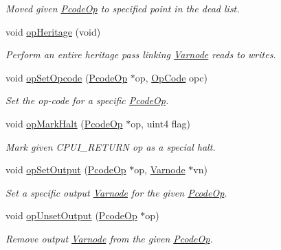 \begin{DoxyCompactItemize}
\begin{DoxyCompactList}\small\item\em Moved given \mbox{\hyperlink{class_pcode_op}{Pcode\+Op}} to specified point in the {\itshape dead} list. \end{DoxyCompactList}\item 
void \mbox{\hyperlink{class_funcdata_a99d243f1e771d6e220330feb534a3fee}{op\+Heritage}} (void)
\begin{DoxyCompactList}\small\item\em Perform an entire heritage pass linking \mbox{\hyperlink{class_varnode}{Varnode}} reads to writes. \end{DoxyCompactList}\item 
void \mbox{\hyperlink{class_funcdata_ad9dbf52668db4a1923537e2128719181}{op\+Set\+Opcode}} (\mbox{\hyperlink{class_pcode_op}{Pcode\+Op}} $\ast$op, \mbox{\hyperlink{opcodes_8hh_abeb7dfb0e9e2b3114e240a405d046ea7}{Op\+Code}} opc)
\begin{DoxyCompactList}\small\item\em Set the op-\/code for a specific \mbox{\hyperlink{class_pcode_op}{Pcode\+Op}}. \end{DoxyCompactList}\item 
void \mbox{\hyperlink{class_funcdata_acdbfab2362e4d4945c3feb7d3f2c42f2}{op\+Mark\+Halt}} (\mbox{\hyperlink{class_pcode_op}{Pcode\+Op}} $\ast$op, uint4 flag)
\begin{DoxyCompactList}\small\item\em Mark given C\+P\+U\+I\+\_\+\+R\+E\+T\+U\+RN op as a {\itshape special} halt. \end{DoxyCompactList}\item 
void \mbox{\hyperlink{class_funcdata_ab2bd3523c574c5b303728ef4d880ec3a}{op\+Set\+Output}} (\mbox{\hyperlink{class_pcode_op}{Pcode\+Op}} $\ast$op, \mbox{\hyperlink{class_varnode}{Varnode}} $\ast$vn)
\begin{DoxyCompactList}\small\item\em Set a specific output \mbox{\hyperlink{class_varnode}{Varnode}} for the given \mbox{\hyperlink{class_pcode_op}{Pcode\+Op}}. \end{DoxyCompactList}\item 
void \mbox{\hyperlink{class_funcdata_ab91b54da6501e12d4ad1e81ab5d0e5c4}{op\+Unset\+Output}} (\mbox{\hyperlink{class_pcode_op}{Pcode\+Op}} $\ast$op)
\begin{DoxyCompactList}\small\item\em Remove output \mbox{\hyperlink{class_varnode}{Varnode}} from the given \mbox{\hyperlink{class_pcode_op}{Pcode\+Op}}. \end{DoxyCompactList}\item 

\end{DoxyCompactItemize}
